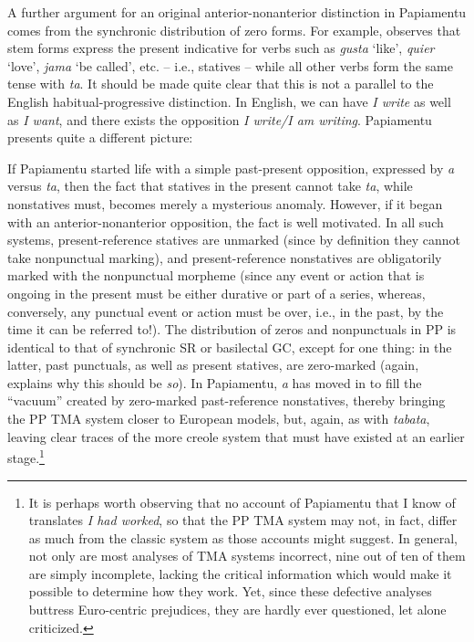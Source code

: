 A further argument for an original anterior-nonanterior distinc\-tion in Papiamentu comes from the synchronic distribution of zero forms. For example, \citet[107]{Goilo1953} observes that stem forms express the present indicative for verbs such as \textit{gusta} `like', \textit{quier} `love', \textit{jama} `be called', etc. -- i.e., statives -- while all other verbs form the same tense with \textit{ta}. It should be made quite clear that this is not a parallel to the English habitual-progressive distinction. In English, we can have \textit{I write} as well as \textit{I want}, and there exists the opposition \textit{I write/I am writing}. Papiamentu presents quite a different picture:

\z
{}

\z

\z

\label{ex:2:102}\z

If Papiamentu started life with a simple past-present opposition,
expressed by \textit{a} versus \textit{ta}, then the fact that statives in the present cannot take \textit{ta}, while nonstatives must, becomes merely a mysterious anomaly. However, if it began with an anterior-nonanterior opposition, the fact is well motivated. In all such systems, present-reference statives are unmarked (since by definition they cannot take nonpunctual mark\-ing), and present-reference nonstatives are obligatorily marked with the nonpunctual morpheme (since any event or action that is ongoing in the present must be either durative or part of a series, whereas, con\-versely, any punctual event or action must be over, i.e., in the past, by the time it can be referred to!). The distribution of zeros and nonpunctuals in PP is identical to that of synchronic SR or basilectal GC, except for one thing: in the latter, past punctuals, as well as present statives, are zero-marked (again, \citet[Chapter 2]{Bickerton1975} explains why this should be \textit{so}). In Papiamentu, \textit{a} has moved in to fill the ``vacuum'' created by zero-marked past-reference nonstatives, thereby bringing the PP TMA system closer to European models, but, again, as with \textit{tabata}, leaving clear traces of the more creole system that must have existed at an earlier stage.\footnote{It is perhaps worth observing that no account of Papiamentu that I know of translates \textit{I had worked}, so that the PP TMA system may not, in fact, differ as much from the classic system as those ac\-counts might suggest. In general, not only are most analyses of TMA systems incorrect, nine out of ten of them are simply incomplete, lacking the critical information which would make it possible to deter\-mine how they work. Yet, since these defective analyses buttress Euro-centric prejudices, they are hardly ever questioned, let alone criticized.}

